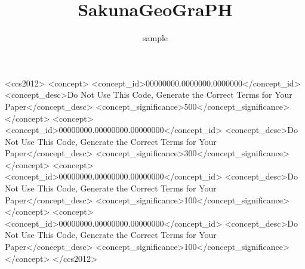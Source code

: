 \documentclass[acmtog]{acmart}
\begin{document}
\title{SakunaGeoGraPH}

\author{sample}
\authornotemark[1]
\renewcommand{\shortauthors}{Trovato et al.}

\begin{abstract}
\end{abstract}

\begin{CCSXML}
<ccs2012>
 <concept>
  <concept_id>00000000.0000000.0000000</concept_id>
  <concept_desc>Do Not Use This Code, Generate the Correct Terms for Your Paper</concept_desc>
  <concept_significance>500</concept_significance>
 </concept>
 <concept>
  <concept_id>00000000.00000000.00000000</concept_id>
  <concept_desc>Do Not Use This Code, Generate the Correct Terms for Your Paper</concept_desc>
  <concept_significance>300</concept_significance>
 </concept>
 <concept>
  <concept_id>00000000.00000000.00000000</concept_id>
  <concept_desc>Do Not Use This Code, Generate the Correct Terms for Your Paper</concept_desc>
  <concept_significance>100</concept_significance>
 </concept>
 <concept>
  <concept_id>00000000.00000000.00000000</concept_id>
  <concept_desc>Do Not Use This Code, Generate the Correct Terms for Your Paper</concept_desc>
  <concept_significance>100</concept_significance>
 </concept>
</ccs2012>
\end{CCSXML}

\end{document}
